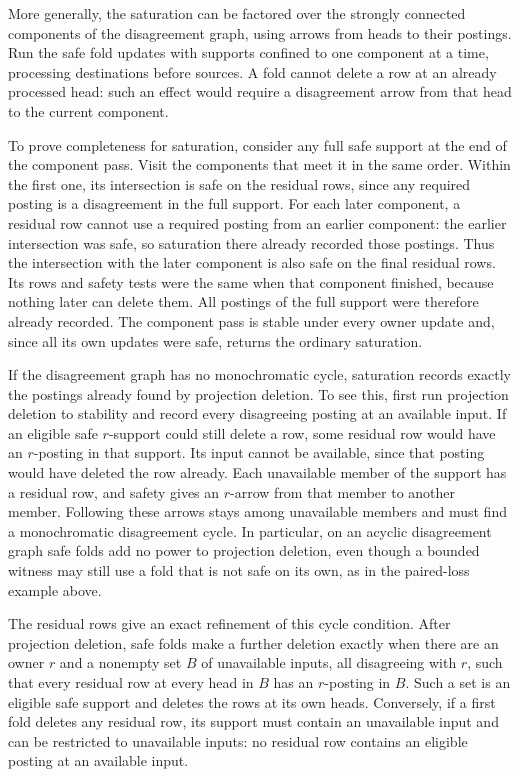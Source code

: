 More generally, the saturation can be factored over
the strongly connected components of the
disagreement graph, using arrows from heads to
their postings. Run the safe fold updates with
supports confined to one component at a time,
processing destinations before sources. A fold
cannot delete a row at an already processed head:
such an effect would require a disagreement arrow
from that head to the current component.

To prove completeness for saturation, consider
any full safe support at the end of the component
pass. Visit the components that meet it in the
same order. Within the first one, its intersection
is safe on the residual rows, since any required
posting is a disagreement in the full support.
For each later component, a residual row cannot
use a required posting from an earlier component:
the earlier intersection was safe, so saturation
there already recorded those postings. Thus the
intersection with the later component is also safe
on the final residual rows. Its rows and safety
tests were the same when that component finished,
because nothing later can delete them. All
postings of the full support were therefore
already recorded. The component pass is stable
under every owner update and, since all its own
updates were safe, returns the ordinary
saturation.

If the disagreement graph has no monochromatic
cycle, saturation records exactly the postings
already found by projection deletion. To see this,
first run projection deletion to stability and
record every disagreeing posting at an available
input. If an eligible safe $r$-support could still
delete a row, some residual row would have an
$r$-posting in that support. Its input cannot be
available, since that posting would have deleted
the row already. Each unavailable member of
the support has a residual row, and safety gives
an $r$-arrow from that member to another member.
Following these arrows stays among unavailable
members and must find a monochromatic disagreement
cycle. In particular, on an acyclic disagreement
graph safe folds add no power to projection
deletion, even though a bounded witness may still
use a fold that is not safe on its own, as in the
paired-loss example above.

The residual rows give an exact refinement of this
cycle condition. After projection deletion, safe
folds make a further deletion exactly when there
are an owner $r$ and a nonempty set $B$ of
unavailable inputs, all disagreeing with $r$, such
that every residual row at every head in $B$ has
an $r$-posting in $B$. Such a set is an eligible
safe support and deletes the rows at its own heads.
Conversely, if a first fold deletes any residual
row, its support must contain an unavailable input
and can be restricted to unavailable inputs:
no residual row contains an eligible posting at an
available input.

